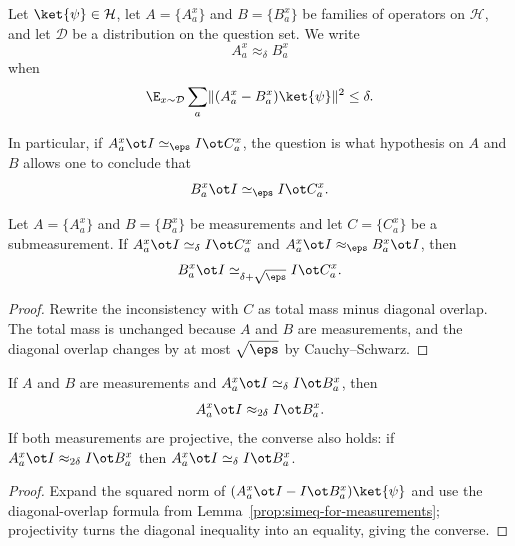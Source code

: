 \begin{definition}\label{def:approx_delta}
	\leanok
	Let $\ket{\psi} \in \mathcal H$, let $A=\{A_a^x\}$ and $B=\{B_a^x\}$ be families of operators on $\mathcal H$, and let $\mathcal D$ be a distribution on the question set. We write
	\[
		A_a^x \approx_\delta B_a^x
	\]
	when
	\[
		\E_{x \sim \mathcal D} \sum_a \lVert (A_a^x-B_a^x)\ket{\psi} \rVert^2 \le \delta.
	\]
\end{definition}

In particular, if $A^x_a \ot I \simeq_{\eps} I \ot C^x_a$, the question is what hypothesis on $A$ and $B$ allows one to conclude that
\begin{equation}\label{eq:can-we-use-approx-delta-to-derive-this}
	B^x_a \ot I \simeq_{\eps} I \ot C^x_a.
\end{equation}

\begin{lemma}\label{prop:triangle-sub}
	\leanok
	Let $A=\{A_a^x\}$ and $B=\{B_a^x\}$ be measurements and let $C=\{C_a^x\}$ be a submeasurement. If $A_a^x \ot I \simeq_\delta I \ot C_a^x$ and $A_a^x \ot I \approx_\eps B_a^x \ot I$, then
	\[
		B_a^x \ot I \simeq_{\delta+\sqrt\eps} I \ot C_a^x.
	\]
\end{lemma}
\begin{proof}
	\leanok
	Rewrite the inconsistency with $C$ as total mass minus diagonal overlap. The total mass is unchanged because $A$ and $B$ are measurements, and the diagonal overlap changes by at most $\sqrt\eps$ by Cauchy--Schwarz.
\end{proof}

\begin{lemma}\label{prop:simeq-to-approx}
	\leanok
	If $A$ and $B$ are measurements and $A_a^x \ot I \simeq_\delta I \ot B_a^x$, then
	\[
		A_a^x \ot I \approx_{2\delta} I \ot B_a^x.
	\]
	If both measurements are projective, the converse also holds: if $A_a^x \ot I \approx_{2\delta} I \ot B_a^x$ then $A_a^x \ot I \simeq_\delta I \ot B_a^x$.
\end{lemma}
\begin{proof}
	\leanok
	Expand the squared norm of $(A_a^x \ot I - I \ot B_a^x)\ket{\psi}$ and use the diagonal-overlap formula from Lemma~\ref{prop:simeq-for-measurements}; projectivity turns the diagonal inequality into an equality, giving the converse.
\end{proof}

